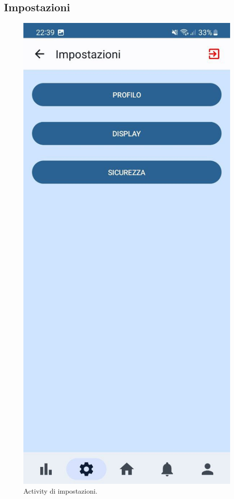 \documentclass[a4paper,final,12pt]{report}
\begin{document}
\subsection{Impostazioni}
\begin{figure}[hbtp]
\centering
\includegraphics[scale=0.20]{img_concettuale/impmob.jpg}
\caption{Activity di impostazioni.}
\end{figure}
\end{document}
